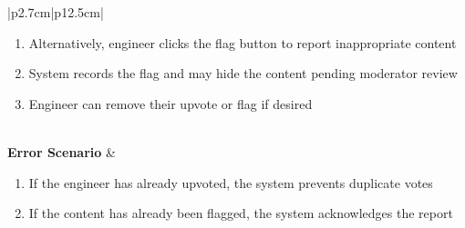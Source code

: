 \begin{table}[H]
\begin{tabular}{|p{2.7cm}|p{12.5cm}|}
\begin{minipage}[t]{\linewidth}
\begin{enumerate}[topsep=0pt,itemsep=1pt,parsep=0pt,partopsep=0pt]
                                              \item Alternatively, engineer clicks the flag button to report inappropriate content
                                              \item System records the flag and may hide the content pending moderator review
                                              \item Engineer can remove their upvote or flag if desired
                                          \end{enumerate}
                                      \end{minipage} \\
            \hline
            \textbf{Error Scenario} & \begin{minipage}[t]{\linewidth}
                                          \begin{enumerate}[topsep=0pt,itemsep=1pt,parsep=0pt,partopsep=0pt]
                                              \item If the engineer has already upvoted, the system prevents duplicate votes
                                              \item If the content has already been flagged, the system acknowledges the report
                                          \end{enumerate}
                                      \end{minipage}    \\
            \hline
        \end{tabular}
        \label{tab:eng-forum-vote}
    \end{table}
